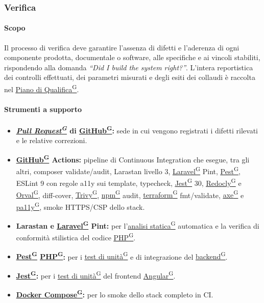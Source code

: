\documentclass[a4paper,12pt]{article}
\providecommand{\glslink}[2]{\href{https://alittlebyte-19.github.io/Documentazione/glossario.html\#gls-#1}{\underline{#2}\textsuperscript{\scriptsize G}}}
\begin{document}
\subsubsection{Verifica}

\paragraph{Scopo}
Il processo di verifica deve garantire l'assenza di difetti e l'aderenza di ogni componente prodotta, documentale o software, alle specifiche e ai vincoli stabiliti, rispondendo alla domanda \textit{``Did I build the system right?''}. L'intera reportistica dei controlli effettuati, dei parametri misurati e degli esiti dei collaudi è raccolta nel \glslink{piano-di-qualifica}{Piano di Qualifica}.

\paragraph{Strumenti a supporto}
\begin{itemize}
    \item \textbf{\textit{\glslink{pull-request}{Pull Request}} di \glslink{github}{GitHub}:} sede in cui vengono registrati i difetti rilevati e le relative correzioni.
    \item \textbf{\glslink{github}{GitHub} Actions:} pipeline di Continuous Integration che esegue, tra gli altri, composer validate/audit, Larastan livello 3, \glslink{laravel}{Laravel} Pint, \glslink{pest}{Pest}, ESLint 9 con regole a11y sui template, typecheck, \glslink{jest}{Jest} 30, \glslink{redocly}{Redocly} e \glslink{orval}{Orval}, diff-cover, \glslink{trivy}{Trivy}, \glslink{npm}{npm} audit, \glslink{terraform}{terraform} fmt/validate, \glslink{axe}{axe} e \glslink{pa11y}{pa11y}, smoke HTTPS/CSP dello stack.
    \item \textbf{Larastan e \glslink{laravel}{Laravel} Pint:} per l'\glslink{analisi-statica}{analisi statica} automatica e la verifica di conformità stilistica del codice \glslink{php}{PHP}.
    \item \textbf{\glslink{pest}{Pest} \glslink{php}{PHP}:} per i \glslink{test-di-unita}{test di unità} e di integrazione del \glslink{backend}{backend}.
    \item \textbf{\glslink{jest}{Jest}:} per i \glslink{test-di-unita}{test di unità} del frontend \glslink{angular}{Angular}.
    \item \textbf{\glslink{docker-compose}{Docker Compose}:} per lo smoke dello stack completo in CI.
\end{itemize}
\end{document}
